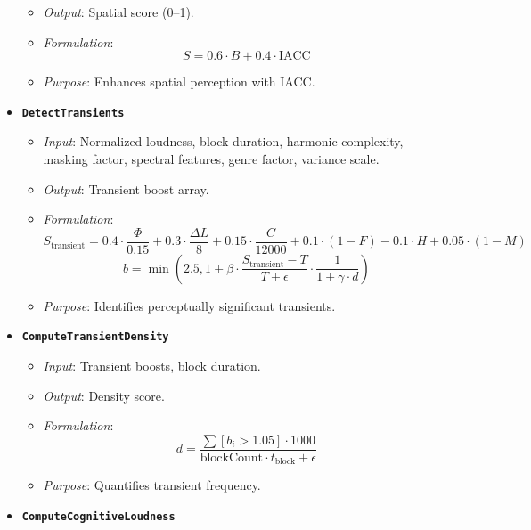 \documentclass[11pt]{article}
\begin{document}
\begin{itemize}[label=$\bullet$]
\begin{itemize}
      \item \textit{Output}: Spatial score (0--1).
      \item \textit{Formulation}:
        \begin{equation}
        S = 0.6 \cdot B + 0.4 \cdot \text{IACC}
        \end{equation}
      \item \textit{Purpose}: Enhances spatial perception with IACC.
    \end{itemize}
  \item \textbf{\texttt{DetectTransients}}
    \begin{itemize}
      \item \textit{Input}: Normalized loudness, block duration, harmonic complexity, masking factor, spectral features, genre factor, variance scale.
      \item \textit{Output}: Transient boost array.
      \item \textit{Formulation}:
        \begin{equation}
        S_{\text{transient}} = 0.4 \cdot \frac{\Phi}{0.15} + 0.3 \cdot \frac{\Delta L}{8} + 0.15 \cdot \frac{C}{12000} + 0.1 \cdot (1 - F) - 0.1 \cdot H + 0.05 \cdot (1 - M)
        \end{equation}
        \begin{equation}
        b = \min\left(2.5, 1 + \beta \cdot \frac{S_{\text{transient}} - T}{T + \epsilon} \cdot \frac{1}{1 + \gamma \cdot d}\right)
        \end{equation}
      \item \textit{Purpose}: Identifies perceptually significant transients.
    \end{itemize}
  \item \textbf{\texttt{ComputeTransientDensity}}
    \begin{itemize}
      \item \textit{Input}: Transient boosts, block duration.
      \item \textit{Output}: Density score.
      \item \textit{Formulation}:
        \begin{equation}
        d = \frac{\sum [b_i > 1.05] \cdot 1000}{\text{blockCount} \cdot t_{\text{block}} + \epsilon}
        \end{equation}
      \item \textit{Purpose}: Quantifies transient frequency.
    \end{itemize}
  \item \textbf{\texttt{ComputeCognitiveLoudness}}

\end{itemize}
\end{document}
